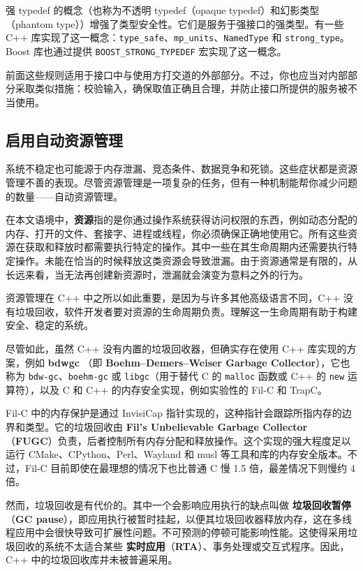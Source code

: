 \label{idx:1005}
强 typedef 的概念（也称为不透明 typedef（opaque typedef）和幻影类型（phantom type））增强了类型安全性。它们是服务于强接口的强类型。有一些 C++ 库实现了这一概念：\texttt{type\_\allowbreak{}safe}、\texttt{mp\_units}、\texttt{NamedType} 和 \texttt{strong\_\allowbreak{}type}。Boost 库也通过提供 \texttt{BOOST\_\allowbreak{}STRONG\_\allowbreak{}TYPEDEF} 宏实现了这一概念。

\label{idx:1006}
前面这些规则适用于接口中与使用方打交道的外部部分。不过，你也应当对内部部分采取类似措施：校验输入，确保取值正确且合理，并防止接口所提供的服务被不当使用。

\subsection{启用自动资源管理}

\label{idx:1007}
系统不稳定也可能源于内存泄漏、竞态条件、数据竞争和死锁。这些症状都是资源管理不善的表现。尽管资源管理是一项复杂的任务，但有一种机制能帮你减少问题的数量——自动资源管理。

\label{idx:1008}
在本文语境中，\textbf{资源}指的是你通过操作系统获得访问权限的东西，例如动态分配的内存、打开的文件、套接字、进程或线程，你必须确保正确地使用它。所有这些资源在获取和释放时都需要执行特定的操作。其中一些在其生命周期内还需要执行特定操作。未能在恰当的时候释放这类资源会导致泄漏。由于资源通常是有限的，从长远来看，当无法再创建新资源时，泄漏就会演变为意料之外的行为。

资源管理在 C++ 中之所以如此重要，是因为与许多其他高级语言不同，C++ 没有垃圾回收，软件开发者要对资源的生命周期负责。理解这一生命周期有助于构建安全、稳定的系统。

\label{idx:1009}
尽管如此，虽然 C++ 没有内置的垃圾回收器，但确实存在使用 C++ 库实现的方案，例如 \textbf{bdwgc }（即 \textbf{Boehm–Demers–Weiser Garbage Collector}），它也称为 \texttt{bdw-gc}、\texttt{boehm-gc} 或 \texttt{libgc}（用于替代 C 的 \texttt{malloc} 函数或 C++ 的 \texttt{new} 运算符），以及 C 和 C++ 的内存安全实现，例如实验性的 Fil-C 和 TrapC。

\label{idx:1010}
Fil-C 中的内存保护是通过 InvisiCap 指针实现的，这种指针会跟踪所指内存的边界和类型。它的垃圾回收由 \textbf{Fil's Unbelievable Garbage Collector }（\textbf{FUGC}）负责，后者控制所有内存分配和释放操作。这个实现的强大程度足以运行 CMake、CPython、Perl、Wayland 和 musl 等工具和库的内存安全版本。不过，Fil-C 目前即使在最理想的情况下也比普通 C 慢 1.5 倍，最差情况下则慢约 4 倍。

\label{idx:1011}
\label{idx:1012}
\label{idx:1013}
然而，垃圾回收是有代价的。其中一个会影响应用执行的缺点叫做 \textbf{垃圾回收暂停}（\textbf{GC pause}），即应用执行被暂时挂起，以便其垃圾回收器释放内存，这在多线程应用中会很快导致可扩展性问题。不可预测的停顿可能影响性能。这使得采用垃圾回收的系统不太适合某些 \textbf{实时应用}（\textbf{RTA}）、事务处理或交互式程序。因此，C++ 中的垃圾回收库并未被普遍采用。

